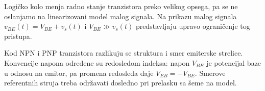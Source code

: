 Logičko kolo menja radno stanje tranzistora preko velikog opsega, pa se ne oslanjamo na linearizovani model malog signala. Na prikazu malog signala $v_{BE}(t)=V_{BE}+v_s(t)$ i $V_{BE}\gg v_s(t)$ predstavljaju upravo ograničenje tog pristupa.

Kod NPN i PNP tranzistora razlikuju se struktura i smer emiterske strelice. Konvencije napona određene su redosledom indeksa: napon $V_{BE}$ je potencijal baze u odnosu na emitor, pa promena redosleda daje $V_{EB}=-V_{BE}$. Smerove referentnih struja treba održavati dosledno pri prelasku sa šeme na model.
